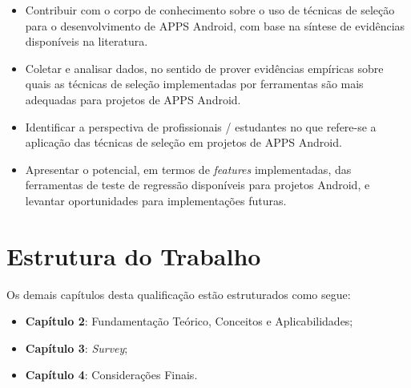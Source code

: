 \begin{itemize}

    \item Contribuir com o corpo de conhecimento sobre o uso de técnicas de seleção para o desenvolvimento de \ac{APPS} Android, com base na síntese de evidências disponíveis na literatura.
    
    \item Coletar e analisar dados, no sentido de prover evidências empíricas sobre quais as técnicas de seleção implementadas por ferramentas são mais adequadas para projetos de \ac{APPS} Android.
    
    \item Identificar a perspectiva de profissionais / estudantes no que refere-se a aplicação das técnicas de seleção em projetos de \ac{APPS} Android.
    
    \item Apresentar o potencial, em termos de \textit{features} implementadas, das ferramentas de teste de regressão disponíveis para projetos Android, e levantar oportunidades para implementações futuras.

\end{itemize}


\section{Estrutura do Trabalho}\label{sec:estruturadotrabalho}

Os demais capítulos desta qualificação estão estruturados como segue: 
\begin{itemize}
\item \textbf{Capítulo 2}: Fundamentação Teórico, Conceitos e Aplicabilidades;
\item \textbf{Capítulo 3}: \textit{Survey};
\item \textbf{Capítulo 4}: Considerações Finais.
\end{itemize}